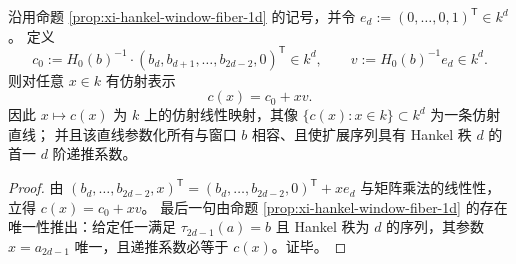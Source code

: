 \begin{proposition}\label{prop:xi-hankel-window-affine-family}
沿用命题 \ref{prop:xi-hankel-window-fiber-1d} 的记号，并令 \(e_d:=(0,\dots,0,1)^{\mathsf T}\in k^d\)。
定义
\[
c_0:=H_0(b)^{-1}\cdot (b_d,b_{d+1},\dots,b_{2d-2},0)^{\mathsf T}\in k^d,
\qquad
v:=H_0(b)^{-1}e_d\in k^d.
\]
则对任意 \(x\in k\) 有仿射表示
\[
c(x)=c_0+xv.
\]
因此 \(x\mapsto c(x)\) 为 \(k\) 上的仿射线性映射，其像 \(\{c(x):x\in k\}\subset k^d\) 为一条仿射直线；
并且该直线参数化所有与窗口 \(b\) 相容、且使扩展序列具有 Hankel 秩 \(d\) 的首一 \(d\) 阶递推系数。
\end{proposition}

\begin{proof}
由
\(
(b_d,\dots,b_{2d-2},x)^{\mathsf T}=(b_d,\dots,b_{2d-2},0)^{\mathsf T}+x e_d
\)
与矩阵乘法的线性性，立得
\(
c(x)=c_0+xv
\)。
最后一句由命题 \ref{prop:xi-hankel-window-fiber-1d} 的存在唯一性推出：给定任一满足 \(\tau_{2d-1}(a)=b\) 且 Hankel 秩为 \(d\) 的序列，其参数 \(x=a_{2d-1}\) 唯一，且递推系数必等于 \(c(x)\)。证毕。
\end{proof}

\endinput
